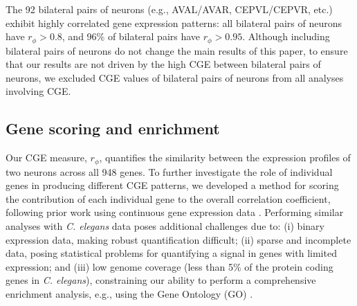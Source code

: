 \documentclass[10pt,letterpaper]{article}
\begin{document}
The 92 bilateral pairs of neurons (e.g., AVAL/AVAR, CEPVL/CEPVR, etc.) exhibit highly correlated gene expression patterns: all bilateral pairs of neurons have $r_\phi > 0.8$, and 96\% of bilateral pairs have $r_\phi > 0.95$.
Although including bilateral pairs of neurons do not change the main results of this paper, to ensure that our results are not driven by the high CGE between bilateral pairs of neurons, we excluded CGE values of bilateral pairs of neurons from all analyses involving CGE.


\subsection*{Gene scoring and enrichment}
Our CGE measure, $r_\phi$, quantifies the similarity between the expression profiles of two neurons across all 948 genes.
To further investigate the role of individual genes in producing different CGE patterns, we developed a method for scoring the contribution of each individual gene to the overall correlation coefficient, following prior work using continuous gene expression data \cite{Fulcher:2016ck}.
Performing similar analyses with \emph{C. elegans} data poses additional challenges due to:
(i) binary expression data, making robust quantification difficult;
(ii) sparse and incomplete data, posing statistical problems for quantifying a signal in genes with limited expression;
and (iii) low genome coverage (less than 5\% of the protein coding genes in \emph{C. elegans}), constraining our ability to perform a comprehensive enrichment analysis, e.g., using the Gene Ontology (GO) \cite{Ashburner2000}.
\end{document}
